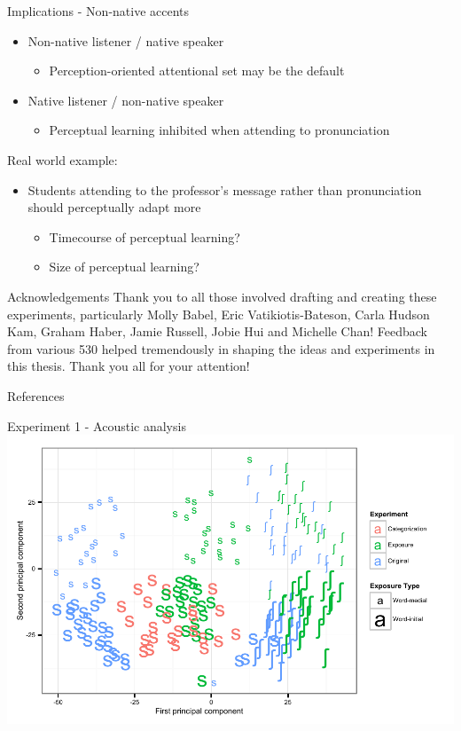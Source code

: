 \documentclass{beamer}
\begin{document}
\begin{frame}{Implications - Non-native accents}
\begin{itemize}
\item Non-native listener / native speaker
\begin{itemize}
\item Perception-oriented attentional set may be the default
\end{itemize}

\item Native listener / non-native speaker
\begin{itemize}
\item Perceptual learning inhibited when attending to pronunciation
\end{itemize}
\end{itemize}
Real world example:
\begin{itemize}
\item Students attending to the professor's message rather than pronunciation should perceptually adapt more
\begin{itemize}
\item Timecourse of perceptual learning?
\item Size of perceptual learning?
\end{itemize}
\end{itemize}

\end{frame}

\begin{frame}{Acknowledgements}
\centering
\vfill
Thank you to all those involved drafting and creating these experiments, particularly Molly Babel, Eric Vatikiotis-Bateson, Carla Hudson Kam, Graham Haber, Jamie Russell, Jobie Hui and Michelle Chan!
\vfill
Feedback from various 530 helped tremendously in shaping the ideas and experiments in this thesis.
\vfill
Thank you all for your attention!
\vfill
\end{frame}

\begin{frame}[allowframebreaks]{References}%
    \footnotesize


\end{frame}


\begin{frame}{Experiment 1 - Acoustic analysis}
\includegraphics[width=1.0\textwidth]{graphs/exp1_mds}
\end{frame}
\end{document}
